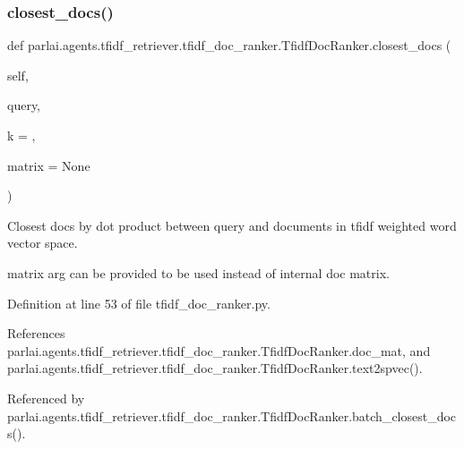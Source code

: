 \subsubsection{\texorpdfstring{closest\+\_\+docs()}{closest\_docs()}}
{\footnotesize\ttfamily def parlai.\+agents.\+tfidf\+\_\+retriever.\+tfidf\+\_\+doc\+\_\+ranker.\+Tfidf\+Doc\+Ranker.\+closest\+\_\+docs (\begin{DoxyParamCaption}\item[{}]{self,  }\item[{}]{query,  }\item[{}]{k = {},  }\item[{}]{matrix = {\ttfamily None} }\end{DoxyParamCaption})}

\begin{DoxyVerb}Closest docs by dot product between query and documents
in tfidf weighted word vector space.

matrix arg can be provided to be used instead of internal doc matrix.
\end{DoxyVerb}
 

Definition at line 53 of file tfidf\+\_\+doc\+\_\+ranker.\+py.



References parlai.\+agents.\+tfidf\+\_\+retriever.\+tfidf\+\_\+doc\+\_\+ranker.\+Tfidf\+Doc\+Ranker.\+doc\+\_\+mat, and parlai.\+agents.\+tfidf\+\_\+retriever.\+tfidf\+\_\+doc\+\_\+ranker.\+Tfidf\+Doc\+Ranker.\+text2spvec().



Referenced by parlai.\+agents.\+tfidf\+\_\+retriever.\+tfidf\+\_\+doc\+\_\+ranker.\+Tfidf\+Doc\+Ranker.\+batch\+\_\+closest\+\_\+docs().

